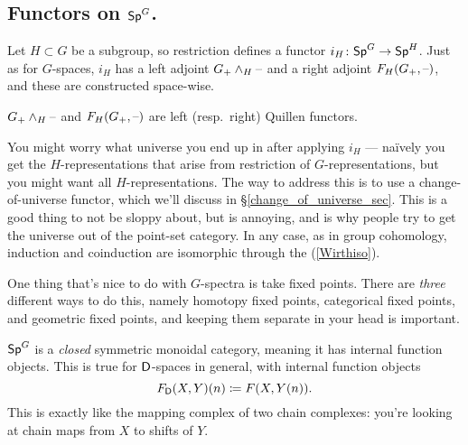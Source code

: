 \subsection*{Functors on $\mathsf{Sp}^G$.}
Let $H\subset G$ be a subgroup, so restriction defines a functor $i_H\colon \mathsf{Sp}^G\to\mathsf{Sp}^H$. Just as for
$G$-spaces, $i_H$ has a left adjoint $G_+\wedge_H\text{--}$ and a right adjoint $F_H(G_+,\text{--})$, and these are constructed
space-wise.
\begin{prop}
$G_+\wedge_H\text{--}$ and $F_H(G_+,\text{--})$ are left (resp.\ right) Quillen functors.
\end{prop}
\begin{rem}
You might worry what universe you end up in after applying $i_H$ --- naïvely you get the $H$-representations that
arise from restriction of $G$-representations, but you might want all $H$-representations. The way to address this
is to use a change-of-universe functor, which we'll discuss in \S\ref{change_of_universe_sec}. This is a good thing
to not be sloppy about, but is annoying, and is why people try to get the universe out of the point-set category.
In any case, as in group cohomology, induction and coinduction are isomorphic through the  (\cref{Wirthiso}).
\end{rem}
One thing that's nice to do with $G$-spectra is take fixed points. There are \emph{three} different ways to do
this, namely homotopy fixed points, categorical fixed points, and geometric fixed points, and keeping them separate
in your head is important.

$\mathsf{Sp}^G$ is a \emph{closed} symmetric monoidal category, meaning it has internal function objects. This is true for
$\mathsf D$-spaces in general, with internal function objects
\[F_\mathsf D(X,Y)(n) \coloneqq F(X, Y(n)).\]
This is exactly like the mapping complex of two chain complexes: you're looking at chain maps from $X$ to shifts of
$Y$.

